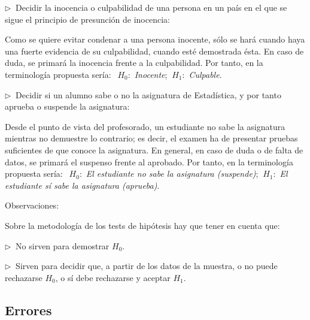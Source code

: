 \vspace{15mm} %

\begin{example}

	$\triangleright\ $ Decidir la inocencia o culpabilidad de una persona en un país en el que se sigue el principio de presunción de inocencia: 

\vspace{2mm} Como se quiere evitar condenar a una persona inocente, sólo se hará cuando haya una fuerte evidencia de su culpabilidad, cuando esté demostrada ésta. En caso de duda, se primará la inocencia frente a la culpabilidad. Por tanto, en la terminología propuesta sería: $\ \  H_0:$ \emph{Inocente}; $\ H_1:$ \emph{Culpable}.

\vspace{5mm} $\triangleright\ $	Decidir si un alumno sabe o no la asignatura de Estadística, y por tanto aprueba o suspende la asignatura: 

\vspace{2mm} Desde el punto de vista del profesorado, un estudiante no sabe la asignatura mientras no demuestre lo contrario; es decir, el examen ha de presentar pruebas suficientes de que conoce la asignatura. En general, en caso de duda o de falta de datos, se primará el suspenso frente al aprobado. Por tanto, en la terminología propuesta sería:	 $\ \ H_0:$ \emph{El estudiante no sabe la asignatura (suspende)}; $\ H_1:$ \emph{El estudiante sí sabe la asignatura (aprueba)}.
\end{example}

\vspace{15mm} %

\begin{theorem}
	
	Observaciones: 
	
	\vspace{2mm} Sobre la metodología de los tests de hipótesis hay que tener en cuenta que: 

\vspace{2mm} $\triangleright\ $	No sirven para demostrar $H_0$.

\vspace{2mm} $\triangleright\ $	Sirven para decidir que, a partir de los datos de la muestra, o no puede rechazarse $H_0$, o sí debe rechazarse y aceptar $H_1$.
\end{theorem}


\newpage %
\subsection{Errores} 

